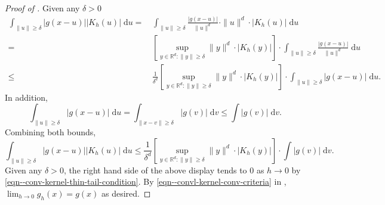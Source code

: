 \begin{proof}[Proof of ]
Given any \(\delta > 0\)
\begin{align*}
  \int_{\|u\| \geq \delta} |g (x - u)| \left| K_{h} (u) \right| \; \mathrm{d} u
  =
  & \, \int_{\|u\| \geq \delta} \frac{|g (x - u)|}{\|u\|^{d}} \cdot \|u\|^{d}
  \cdot \left| K_{h} (u) \right| \; \mathrm{d} u \\
  =
  & \, \left[ \sup_{y \in \mathbb{R}^{d} : \|y\| \geq \delta} \|y\|^{d} \cdot
  \left| K_{h} (y) \right| \right] \cdot \int_{\|u\| \geq \delta} \frac{|g (x -
  u)|}{\|u\|^{d}} \; \mathrm{d} u \\
  \leq
  & \, \frac{1}{\delta^{d}} \left[ \sup_{y \in \mathbb{R}^{d} : \|y\| \geq
  \delta} \|y\|^{d} \cdot \left| K_{h} (y) \right| \right] \cdot \int_{\|u\|
  \geq \delta} |g (x - u)| \; \mathrm{d} u.
\end{align*}
In addition,
\begin{equation*}
  \int_{\|u\| \geq \delta} |g (x - u)| \; \mathrm{d} u = \int_{\|x - v\| \geq
  \delta} |g (v)| \; \mathrm{d} v \leq \int |g (v)| \; \mathrm{d} v.
\end{equation*}
Combining both bounds,
\begin{equation*}
  \int_{\|u\| \geq \delta} |g (x - u)| \left| K_{h} (u) \right| \; \mathrm{d} u
  \leq \frac{1}{\delta^{d}} \left[ \sup_{y \in \mathbb{R}^{d} : \|y\| \geq
  \delta} \|y\|^{d} \cdot \left| K_{h} (y) \right| \right] \cdot \int |g (v)| \;
  \mathrm{d} v.
\end{equation*}
Given any \(\delta > 0\), the right hand side of the above display tends to 0 as
\(h \to 0\) by \eqref{eqn--conv-kernel-thin-tail-condition}.
By \eqref{eqn--convl-kernel-conv-criteria} in
, \(\lim_{h \to 0} g_{h} (x) = g (x)\) as
desired.
\end{proof}


